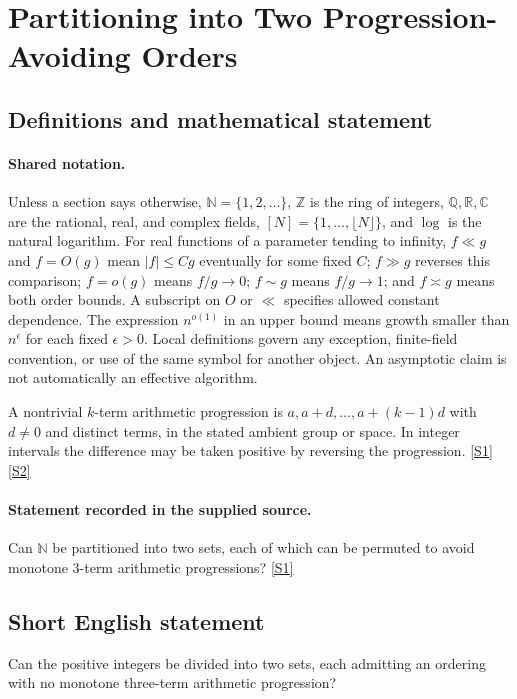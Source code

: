 \documentclass[11pt,a4paper]{article}
\newcommand{\N}{\mathbb{N}}
\newcommand{\Z}{\mathbb{Z}}
\newcommand{\Q}{\mathbb{Q}}
\newcommand{\R}{\mathbb{R}}
\newcommand{\C}{\mathbb{C}}
\newcommand{\sref}[2]{\hyperlink{source:#1:#2}{[S#2]}}
\begin{document}
\section{Partitioning into Two Progression-Avoiding Orders}\label{statement}


\subsection{Definitions and mathematical statement}

\paragraph{Shared notation.}Unless a section says otherwise, $\N=\{1,2,\ldots\}$,
$\Z$ is the ring of integers, $\Q,\R,\C$ are the rational, real, and complex
fields, $[N]=\{1,\ldots,\lfloor N\rfloor\}$, and $\log$ is the natural
logarithm. For real functions of a parameter tending to infinity,
$f\ll g$ and $f=O(g)$ mean $|f|\leq Cg$ eventually for some fixed $C$;
$f\gg g$ reverses this comparison; $f=o(g)$ means $f/g\to0$;
$f\sim g$ means $f/g\to1$; and $f\asymp g$ means both order bounds.
A subscript on $O$ or $\ll$ specifies allowed constant dependence.
The expression $n^{o(1)}$ in an upper bound means growth smaller than
$n^\epsilon$ for each fixed $\epsilon>0$. Local definitions govern any
exception, finite-field convention, or use of the same symbol for another
object. An asymptotic claim is not automatically an effective algorithm.



A nontrivial $k$-term arithmetic progression is $a,a+d,\ldots,a+(k-1)d$ with $d\ne0$ and distinct terms, in the stated ambient group or space. In integer intervals the difference may be taken positive by reversing the progression. \sref{statement}{1} \sref{statement}{2}

\paragraph{Statement recorded in the supplied source.}
Can $\mathbb{N}$ be partitioned into two sets, each of which can be permuted to avoid monotone 3-term arithmetic progressions? \sref{statement}{1}

\subsection{Short English statement}

Can the positive integers be divided into two sets, each admitting an ordering with no monotone three-term arithmetic progression?
\end{document}

